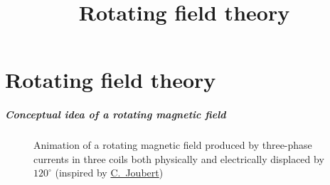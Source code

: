 \part{Rotating field theory}
\title[Rotating field theory]{Rotating field theory}  
\date{}  
\frame{\titlepage} 

\begin{frame}
	\frametitle{Conceptual idea of a rotating magnetic field}
    \begin{figure}
        \centering
        \caption{Animation of a rotating magnetic field produced by three-phase currents in three coils both physically and electrically displaced by $120^\circ$ (inspired by \href{https://perso.univ-lyon1.fr/charles.joubert/web_anim/simen_rotfield_create.html}{C.~Joubert})}
        \label{fig:Three_phase_coils_rotating_field_animation}
    \end{figure}
\end{frame}


